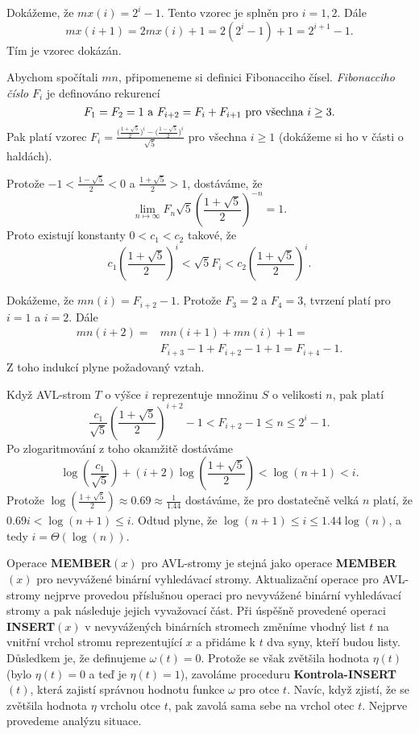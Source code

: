 \documentclass[a4paper,12pt]{article}
\begin{document}
Dokážeme, že $mx(i)=2^i-1$. Tento vzorec je 
splněn pro $i=1,2$. Dále 
$$mx(i+1)=2mx(i)+1=2(2^i-1)+1=2^{i+1}-1.$$
Tím je vzorec dokázán. 

Abychom spočítali $mn$, připomeneme si definici Fibonacciho čísel. \emph{Fibonacciho} 
\emph{číslo} $F_i$ je definováno rekurencí
$$F_1=F_2=1\text{\rm\ a }F_{i+2}=F_i+F_{i+1}\text{\rm\ pro všechna }
i\ge 3.$$
Pak platí vzorec $F_i=\frac {\big(\frac {1+\sqrt 5}2\big)^i-\big
(\frac {1-\sqrt 5}2\big)^i}{\sqrt 5}$ pro všechna $i\ge 1$ 
(dokážeme si ho v části o haldách). 

Protože 
$-1<\frac {1-\sqrt 5}2<0$ a $\frac {1+\sqrt 5}2>1$, dostáváme, že 
$$\lim_{n\mapsto\infty}F_n\sqrt 5(\frac {1+\sqrt 5}2)^{-n}=1.$$
Proto existují konstanty $0<c_1<c_2$ takové, že 
$$c_1(\frac {1+\sqrt 5}2)^i<\sqrt 5F_i<c_2(\frac {1+\sqrt 5}2)^i.$$

Dokážeme, že $mn(i)=F_{i+2}-1$. Protože $F_3
=2$ a 
$F_4=3$, 
tvrzení platí pro $i=1$ a $i=2$. Dále 
\begin{align*} mn(i+2)=&mn(i+1)+mn(i)+1=\\&F_{i+3}-1+F_{i+2}-1+1=F_{i+4}-1.\end{align*}
Z toho indukcí plyne požadovaný vztah. 

Když AVL-strom $T$ o výšce $i$ reprezentuje množinu $
S$ o 
velikosti $n$, pak platí 
$$\frac {c_1}{\sqrt 5}(\frac {1+\sqrt 5}2)^{i+2}-1<F_{i+2}-1\le n
\le 2^i-1.$$
Po zlogaritmování z toho okamžitě dostáváme
$$\log(\frac {c_1}{\sqrt 5})+(i+2)\log(\frac {1+\sqrt 5}2)<\log(n
+1)<i.$$
Protože $\log(\frac {1+\sqrt 5}2)\approx 0.69\approx\frac 1{1.
44}$ dostáváme, že pro dostatečně velká $n$ 
platí, že $0.69i<\log(n+1)\le i$. Odtud plyne, že 
$\log(n+1)\le i\le 1.44\log(n)$, a tedy $i=\Theta (\log(n))$.

Operace {\bf MEMBER$(x)$} pro AVL-stromy je stejná jako 
ope\-race {\bf MEMBER$(x)$} pro nevy\-vá\-žené binární vyhledávací 
stro\-my. Aktualizační operace pro AVL-stromy nejprve provedou 
příslušnou ope\-raci pro nevyvážené binární vyhledávací stromy 
a pak násle\-du\-je jejich vyvažovací část. Při úspěšně 
provedené operaci {\bf IN\-SERT$(x)$} v nevyvážených binárních 
stromech změníme vhod\-ný list $t$ na vnitřní vrchol 
stromu reprezentující $x$ a přidáme k $t$ dva syny, kteří 
budou listy. Důsledkem je, že definujeme 
$\omega (t)=0$. Protože se však zvětšila hodnota $\eta 
(t)$ (bylo 
$\eta (t)=0$ a teď je $\eta (t)=1$), zavoláme proceduru 
{\bf Kontrola-INSERT$(t)$}, která zajistí správnou hodnotu 
funkce $\omega$ pro otce $t$. Navíc, když zjistí, že se zvětšila 
hodnota $\eta$ vrcholu otce $t$, pak zavolá sama sebe na vrchol 
otec $t$. Nejprve provedeme analýzu situace. 
\end{document}
